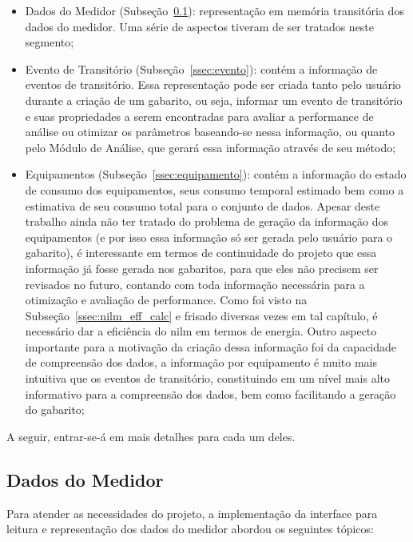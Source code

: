 \begin{itemize}
\item Dados do Medidor (Subseção~\ref{ssec:dados_medidor}):
representação em memória transitória dos dados do medidor. Uma série
de aspectos tiveram de ser tratados neste segmento;
\item Evento de Transitório (Subseção~\ref{ssec:evento}): contém a informação de
eventos de transitório. Essa representação pode ser criada tanto pelo
usuário durante a criação de um gabarito, ou seja, informar um evento
de transitório e suas propriedades a serem encontradas para avaliar a
performance de análise ou otimizar os parâmetros baseando-se nessa
informação, ou quanto pelo Módulo de Análise, que gerará essa
informação através de seu método;
\item Equipamentos (Subseção~\ref{ssec:equipamento}): contém a informação
do estado de consumo dos equipamentos, seus consumo temporal estimado bem
como a estimativa de seu consumo total para o conjunto de dados.
Apesar deste trabalho ainda não ter tratado do problema de geração da
informação dos equipamentos (e por isso essa informação só ser gerada
pelo usuário para o gabarito), é interessante em termos de
continuidade do projeto que essa informação já fosse gerada nos
gabaritos, para que eles não precisem ser revisados no futuro,
contando com toda informação necessária para a otimização e avaliação
de performance. Como foi visto na Subseção~\ref{ssec:nilm_eff_calc} e
frisado diversas vezes em tal capítulo, é necessário dar a eficiência
do \gls{nilm} em termos de energia. Outro aspecto importante para a
motivação da criação dessa informação foi da capacidade de compreensão
dos dados, a informação por equipamento é muito mais intuitiva que os
eventos de transitório, constituindo em um nível mais alto informativo
para a compreensão dos dados, bem como facilitando a geração do
gabarito;
\end{itemize}

A seguir, entrar-se-á em mais detalhes para cada um deles.

\subsection{Dados do Medidor}
\label{ssec:dados_medidor}

Para atender as necessidades do projeto, a implementação da interface
para leitura e representação dos dados do medidor abordou os seguintes
tópicos:

